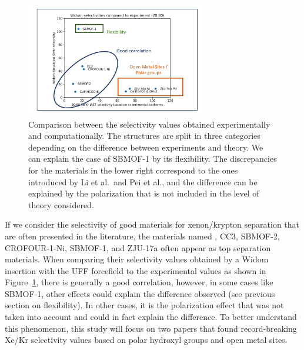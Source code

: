 \documentclass[main]{subfiles}
\begin{document}
\begin{figure}[ht]
  \centering
  \includegraphics[width=0.7\textwidth]{figures/6-perspectives/exp_theory_discrepancies.pdf}
  \caption{ Comparison between the selectivity values obtained experimentally and computationally. The structures are split in three categories depending on the difference between experiments and theory. We can explain the case of SBMOF-1 by its flexibility. The discrepancies for the materials in the lower right correspond to the ones introduced by Li et al.\ and Pei et al.,\autocite{Li_2019,Pei_2022} and the difference can be explained by the polarization that is not included in the level of theory considered. }\label{fgr:exp_theory_discrepancy}
\end{figure}

If we consider the selectivity of good materials for xenon/krypton separation that are often presented in the literature, the materials named ,\autocite{Wang_2014} CC3,\autocite{Chen_2014} SBMOF-2,\autocite{Chen_2015} CROFOUR-1-Ni,\autocite{Mohamed_2016}  SBMOF-1,\autocite{Banerjee_2016} \autocite{Li_2019} and ZJU-17a\autocite{Pei_2022} often appear as top separation materials.
When comparing their selectivity values obtained by a Widom insertion with the UFF forcefield to the experimental values as shown in Figure~\ref{fgr:exp_theory_discrepancy}, there is generally a good correlation, however, in some cases like SBMOF-1, other effects could explain the difference observed (see previous section on flexibility). In other cases, it is the polarization effect that was not taken into account and could in fact explain the difference. To better understand this phenomenon, this study will focus on two papers that found record-breaking Xe/Kr selectivity values based on polar hydroxyl groups and open metal sites.
\end{document}
